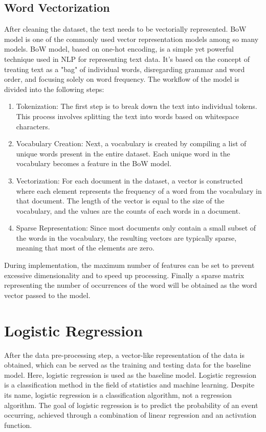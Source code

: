 \documentclass[ %
                    author={Louis Wang},
                supervisor={Dr. Qiang Liu},
                    degree={MSc},
                     title={Identification of Suicide Ideation in Texts},
                      type={},
                      year={2024}]{dissertation}
\begin{document}
\subsection{Word Vectorization}
\noindent
After cleaning the dataset, the text needs to be vectorially represented. BoW model is one of the commonly used vector representation models among so many models. BoW model, based on one-hot encoding\cite{chren1998one}, is a simple yet powerful technique used in NLP for representing text data. It's based on the concept of treating text as a "bag" of individual words, disregarding grammar and word order, and focusing solely on word frequency. The workflow of the model is divided into the following steps:

\begin{enumerate}
      \item Tokenization: The first step is to break down the text into individual tokens. This process involves splitting the text into words based on whitespace characters.
      \item Vocabulary Creation: Next, a vocabulary is created by compiling a list of unique words present in the entire dataset. Each unique word in the vocabulary becomes a feature in the BoW model.
      \item Vectorization: For each document in the dataset, a vector is constructed where each element represents the frequency of a word from the vocabulary in that document. The length of the vector is equal to the size of the vocabulary, and the values are the counts of each words in a document.
      \item Sparse Representation: Since most documents only contain a small subset of the words in the vocabulary, the resulting vectors are typically sparse, meaning that most of the elements are zero.
\end{enumerate}

During implementation, the maximum number of features can be set to prevent excessive dimensionality and to speed up processing. Finally a sparse matrix representing the number of occurrences of the word will be obtained as the word vector passed to the model.

\section{Logistic Regression}
\noindent
After the data pre-processing step, a vector-like representation of the data is obtained, which can be served as the training and testing data for the baseline model. Here, logistic regression is used as the baseline model. Logistic regression is a classification method in the field of statistics and machine learning. Despite its name, logistic regression is a classification algorithm, not a regression algorithm. The goal of logistic regression is to predict the probability of an event occurring, achieved through a combination of linear regression and an activation function.
\end{document}
